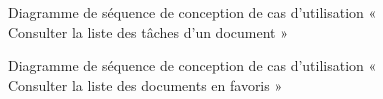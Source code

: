 \begin{figure}[H]
  \centering
  \caption{Diagramme de séquence de conception de cas d'utilisation « Consulter la liste des tâches d'un document »}
  \label{fig:sequence_conception_previewTasks}
\end{figure}
\begin{figure}[H]
  \centering
  \caption{Diagramme de séquence de conception de cas d'utilisation « Consulter la liste des documents en favoris »}
  \label{fig:sequence_conception_favoritDocument}
\end{figure}
